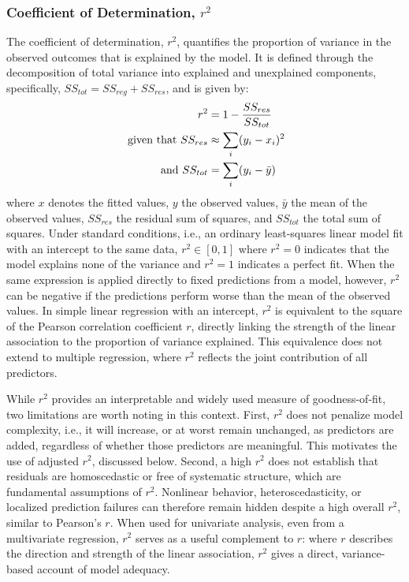 \subsubsection{Coefficient of Determination, \textit{$r^2$}}\label{sec:Eval:subsec:RegMetrics:subsubsec:r2}
The coefficient of determination, $r^2$, quantifies the proportion of variance in the observed outcomes that is explained by the model. It is defined through the decomposition of total variance into explained and unexplained components, specifically, $SS_{tot} = SS_{reg} + SS_{res}$, and is given by:
\begin{equation}\label{eqn:r2}
\begin{aligned}
    r^2 &= 1 - \frac{SS_{res}}{SS_{tot}}
    \\ \textnormal{ given that } SS_{res} &\approx \sum_i(y_i - x_i)^2 
    \\ \textnormal{ and } SS_{tot} &= \sum_i (y_i - \Bar{y})
\end{aligned}
\end{equation}
\noindent where $x$ denotes the fitted values, $y$ the observed values, $\bar{y}$ the mean of the observed values, $SS_{res}$ the residual sum of squares, and $SS_{tot}$ the total sum of squares. Under standard conditions, i.e., an ordinary least-squares linear model fit with an intercept to the same data, $r^2 \in [0, 1]$ where $r^2 = 0$ indicates that the model explains none of the variance and $r^2 = 1$ indicates a perfect fit. When the same expression is applied directly to fixed predictions from a \DL model, however, $r^2$ can be negative if the predictions perform worse than the mean of the observed values. In simple linear regression with an intercept, $r^2$ is equivalent to the square of the Pearson correlation coefficient $r$, directly linking the strength of the linear association to the proportion of variance explained. This equivalence does not extend to multiple regression, where $r^2$ reflects the joint contribution of all predictors.

While $r^2$ provides an interpretable and widely used measure of goodness-of-fit, two limitations are worth noting in this context. First, $r^2$ does not penalize model complexity, i.e., it will increase, or at worst remain unchanged, as predictors are added, regardless of whether those predictors are meaningful. This motivates the use of adjusted $r^2$, discussed below. Second, a high $r^2$ does not establish that residuals are homoscedastic or free of systematic structure, which are fundamental assumptions of $r^2$. Nonlinear behavior, heteroscedasticity, or localized prediction failures can therefore remain hidden despite a high overall $r^2$, similar to Pearson's $r$. When used for univariate analysis, even from a multivariate regression, $r^2$ serves as a useful complement to $r$: where $r$ describes the direction and strength of the linear association, $r^2$ gives a direct, variance-based account of model adequacy.

